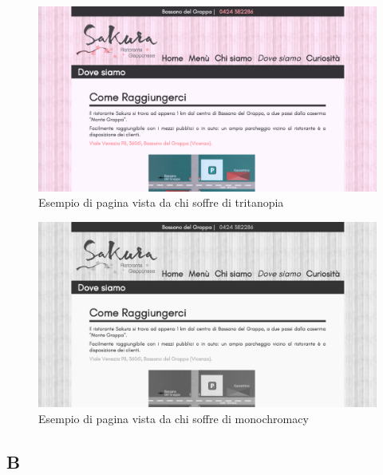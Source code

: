 \documentclass[../relazione.tex]{subfiles}
\begin{document}
	\begin{figure}[H]
	\centering
		\includegraphics[width=\textwidth]{images/colorblindness/tritanopia}
		\caption{Esempio di pagina vista da chi soffre di tritanopia}
		\label{fig:Esempio di pagina vista da chi soffre di tritanopia}
	\end{figure}
	\begin{figure}[H]
	\centering
		\includegraphics[width=\textwidth]{images/colorblindness/monochromacy}
		\caption{Esempio di pagina vista da chi soffre di monochromacy}
		\label{fig:Esempio di pagina vista da chi soffre di monochromacy}
	\end{figure}
	\subsection{B}
\end{document}
